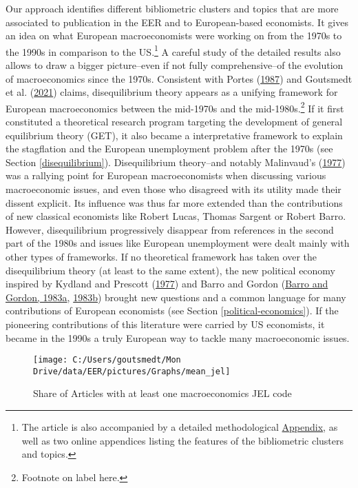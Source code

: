 \documentclass[]{elsarticle} %
\begin{document}
Our approach identifies different bibliometric clusters and topics that
are more associated to publication in the EER and to European-based
economists. It gives an idea on what European macroeconomists were
working on from the 1970s to the 1990s in comparison to the
US.\footnote{The article is also accompanied by a detailed
  methodological \protect\hyperlink{appendix}{Appendix}, as well as two
  online appendices listing the features of the bibliometric clusters
  and topics.} A careful study of the detailed results also allows to
draw a bigger picture--even if not fully comprehensive--of the evolution
of macroeconomics since the 1970s. Consistent with Portes
(\protect\hyperlink{ref-portes1987}{1987}) and Goutsmedt et al.
(\protect\hyperlink{ref-goutsmedt2021}{2021}) claims, disequilibrium
theory appears as a unifying framework for European macroeconomics
between the mid-1970s and the mid-1980s.\footnote{Footnote on label
  here.} If it first constituted a theoretical research program
targeting the development of general equilibrium theory (GET), it also
became a interpretative framework to explain the stagflation and the
European unemployment problem after the 1970s (see Section
\ref{disequilibrium}). Disequilibrium theory--and notably Malinvaud's
(\protect\hyperlink{ref-malinvaud1977}{1977}) was a rallying point for
European macroeconomists when discussing various macroeconomic issues,
and even those who disagreed with its utility made their dissent
explicit. Its influence was thus far more extended than the
contributions of new classical economists like Robert Lucas, Thomas
Sargent or Robert Barro. However, disequilibrium progressively disappear
from references in the second part of the 1980s and issues like European
unemployment were dealt mainly with other types of frameworks. If no
theoretical framework has taken over the disequilibrium theory (at least
to the same extent), the new political economy inspired by Kydland and
Prescott (\protect\hyperlink{ref-kydland1977}{1977}) and Barro and
Gordon (\protect\hyperlink{ref-barro1983}{Barro and Gordon, 1983a},
\protect\hyperlink{ref-barro1983c}{1983b}) brought new questions and a
common language for many contributions of European economists (see
Section \ref{political-economics}). If the pioneering contributions of
this literature were carried by US economists, it became in the 1990s a
truly European way to tackle many macroeconomic issues.

\begin{figure}[h]

{\centering \texttt{[image: C:/Users/goutsmedt/Mon Drive/data/EER/pictures/Graphs/mean\_jel]} 

}

\caption{Share of Articles with at least one macroeconomics JEL code}\label{fig:plot-jel}
\end{figure}
\end{document}
